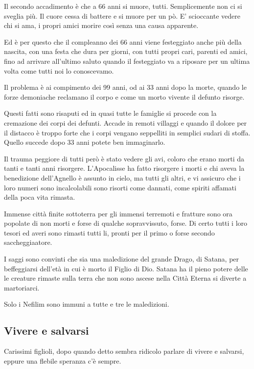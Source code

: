 \documentclass[12pt,a4paper,twoside,openany]{book}
\begin{document}
\begin{multicols}{2}
Il secondo accadimento è che a 66 anni si muore, tutti. Semplicemente non ci si sveglia più. Il cuore cessa di battere e si muore per un pò.
E' scioccante vedere chi si ama, i propri amici morire così senza una causa apparente.

Ed è per questo che il compleanno dei 66 anni viene festeggiato anche più della nascita, con una festa che dura per giorni, con tutti propri cari, parenti ed amici, fino ad arrivare all'ultimo saluto quando il festeggiato va a riposare per un ultima volta come tutti noi lo conoscevamo.

Il problema è ai compimento dei 99 anni, od ai 33 anni dopo la morte, quando le forze demoniache reclamano il corpo e come un morto vivente il defunto risorge.

Questi fatti sono risaputi ed in quasi tutte le famiglie si procede con la cremazione dei corpi dei defunti. Accade in remoti villaggi e quando il dolore per il distacco è troppo forte che i corpi vengano seppelliti in semplici sudari di stoffa. Quello succede dopo 33 anni potete ben immaginarlo.

Il trauma peggiore di tutti però è stato vedere gli avi, coloro che erano morti da tanti e tanti anni risorgere. L'Apocalisse ha fatto risorgere i morti e chi aveva la benedizione dell'Agnello è assunto in cielo, ma tutti gli altri, e vi assicuro che i loro numeri sono incalcolabili sono risorti come dannati, come spiriti affamati della poca vita rimasta.

Immense città finite sottoterra per gli immensi terremoti e fratture sono ora popolate di non morti e forse di qualche sopravvissuto, forse. Di certo tutti i loro tesori ed averi sono rimasti tutti li, pronti per il primo o forse secondo saccheggiaatore.

I saggi sono convinti che sia una maledizione del grande Drago, di Satana, per beffeggiarsi dell'età in cui è morto il Figlio di Dio. 
Satana ha il pieno potere delle le creature rimaste sulla terra che non sono ascese nella Città Eterna si diverte a martoriarci. 

Solo i Nefilim sono immuni a tutte e tre le maledizioni.

\subsection{Vivere e salvarsi}

Carissimi figlioli, dopo quando detto sembra ridicolo parlare di vivere e salvarsi, eppure una flebile speranza c'è sempre.


\end{multicols}
\end{document}
